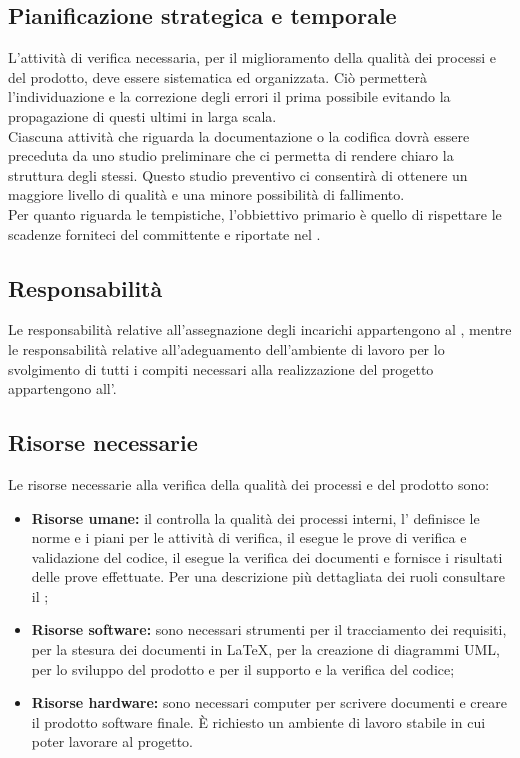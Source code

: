 	\subsection{Pianificazione strategica e temporale}
	L'attività di verifica necessaria, per il miglioramento della qualità dei processi e del prodotto, deve essere sistematica ed organizzata. Ciò permetterà l'individuazione e la correzione degli errori il prima possibile evitando la propagazione di questi ultimi in larga scala.\\
	Ciascuna attività che riguarda la documentazione o la codifica dovrà essere preceduta da uno studio preliminare che ci permetta di rendere chiaro la struttura degli stessi. Questo studio preventivo ci consentirà di ottenere un maggiore livello di qualità e una minore possibilità di fallimento. \\
	Per quanto riguarda le tempistiche, l'obbiettivo primario è quello di rispettare le scadenze forniteci del committente e riportate nel \docNameVersionPdP.
	
	\subsection{Responsabilità}
	Le responsabilità relative all'assegnazione degli incarichi appartengono al \roleProjectManager, mentre le responsabilità relative all'adeguamento dell'ambiente di lavoro per lo svolgimento di tutti i compiti necessari alla realizzazione del progetto appartengono all'\roleAdministrator.

	\subsection{Risorse necessarie}
	Le risorse necessarie alla verifica della qualità dei processi e del prodotto sono:
		\begin{itemize}
  			\item \textbf{Risorse umane:} \textnormal{il \roleProjectManager{} controlla la qualità dei processi interni, l'\roleAdministrator{} definisce le norme e i piani per le attività di verifica, il \roleProgrammer{} esegue le prove di verifica e validazione del codice, il \roleVerifier{} esegue la verifica dei documenti e fornisce i risultati delle prove effettuate. Per una descrizione più dettagliata dei ruoli consultare il \docNameVersionPdP;}
  			\item \textbf{Risorse software:} \textnormal{sono necessari strumenti per il tracciamento dei requisiti, per la stesura dei documenti in \LaTeX, per la creazione di diagrammi UML, per lo sviluppo del prodotto e per il supporto e la verifica del codice;}
  			\item \textbf{Risorse hardware:} \textnormal{sono necessari computer per scrivere documenti e creare il prodotto software finale. \`E richiesto un ambiente di lavoro stabile in cui poter lavorare al progetto.}
		\end{itemize}

